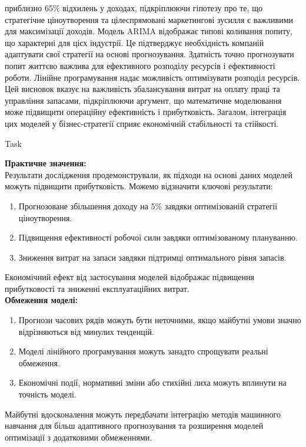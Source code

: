 \documentclass[a4paper,12pt]{article}
\newcommand{\RomanNumeralCaps}[1]{\MakeUppercase{\romannumeral #1}}
\begin{document}
    приблизно 65\% відхилень у доходах, підкріплюючи гіпотезу про те, що стратегічне ціноутворення та цілеспрямовані 
    маркетингові зусилля є важливими для максимізації доходів.
    Модель ARIMA відображає типові коливання попиту, що характерні для цієх індустрії. Це підтверджує необхідність компаній адаптувати 
    свої стратегії на основі прогнозування. Здатність точно прогнозувати попит життєво важлива для ефективного розподілу ресурсів і ефективності роботи.
    Лінійне програмування надає можливість оптимізувати розподіл ресурсів. Цей висновок вказує на важливість збалансування витрат на оплату праці 
    та управління запасами, підкріплюючи аргумент, що математичне моделювання може підвищити операційну ефективність і прибутковість. 
    Загалом, інтеграція цих моделей у бізнес-стратегії сприяє економічній стабільності та стійкості.

\newpage
    \begin{center}
        \Large{Task \RomanNumeralCaps{2}}
    \end{center}
    \textbf{Практичне значення:} \\
    Результати дослідження продемонстрували, як підходи на основі даних моделей можуть підвищити прибутковість. Можемо відзначити ключові результати:
    \begin{enumerate}
        \item Прогнозоване збільшення доходу на 5\% завдяки оптимізованій стратегії ціноутворення.
        \item Підвищення ефективності робочої сили завдяки оптимізованому плануванню.
        \item Зниження витрат на запаси завдяки підтримці оптимального рівня запасів.
    \end{enumerate}
    Економічний ефект від застосування моделей відображає підвищення прибутковості та зниженні експлуатаційних витрат. \\
    \textbf{Обмеження моделі:}
    \begin{enumerate}
        \item Прогнози часових рядів можуть бути неточними, якщо майбутні умови значно відрізняються від минулих тенденцій.
        \item Моделі лінійного програмування можуть занадто спрощувати реальні обмеження.
        \item Економічні події, нормативні зміни або стихійні лиха можуть вплинути на точність моделі.
    \end{enumerate}
    Майбутні вдосконалення можуть передбачати інтеграцію методів машинного навчання для більш адаптивного прогнозування та розширення моделей 
    оптимізації з додатковими обмеженнями.
\end{document}
